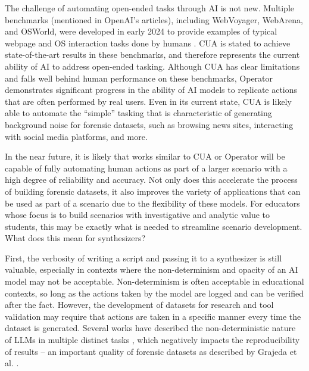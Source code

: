 The challenge of automating open-ended tasks through AI is not new.
Multiple benchmarks (mentioned in OpenAI's articles), including
WebVoyager, WebArena, and OSWorld, were developed in early 2024 to
provide examples of typical webpage and OS interaction tasks done by
humans
\cite{zhouWebArenaRealisticWeb2024,heWebVoyagerBuildingEndtoEnd2024,xieOSWorldBenchmarkingMultimodal2024}.
CUA is stated to achieve state-of-the-art results in these benchmarks,
and therefore represents the current ability of AI to address open-ended
tasking. Although CUA has clear limitations and falls well behind human
performance on these benchmarks, Operator demonstrates significant
progress in the ability of AI models to replicate actions that are often
performed by real users. Even in its current state, CUA is likely able
to automate the ``simple'' tasking that is characteristic of generating
background noise for forensic datasets, such as browsing news sites,
interacting with social media platforms, and more.

In the near future, it is likely that works similar to CUA or Operator
will be capable of fully automating human actions as part of a larger
scenario with a high degree of reliability and accuracy. Not only does
this accelerate the process of building forensic datasets, it also
improves the variety of applications that can be used as part of a
scenario due to the flexibility of these models. For educators whose
focus is to build scenarios with investigative and analytic value to
students, this may be exactly what is needed to streamline scenario
development. What does this mean for synthesizers?

First, the verbosity of writing a script and passing it to a synthesizer
is still valuable, especially in contexts where the non-determinism and
opacity of an AI model may not be acceptable. Non-determinism is often
acceptable in educational contexts, so long as the actions taken by the
model are logged and can be verified after the fact. However, the
development of datasets for research and tool validation may require
that actions are taken in a specific manner every time the dataset is
generated. Several works have described the non-deterministic nature of
LLMs in multiple distinct tasks
\cite{astekinExploratoryStudyHow2024,songGoodBadGreedy2024,ouyangEmpiricalStudyNonDeterminism2025},
which negatively impacts the reproducibility of results -- an important
quality of forensic datasets as described by Grajeda et al.
\cite{grajedaAvailabilityDatasetsDigital2017}.


